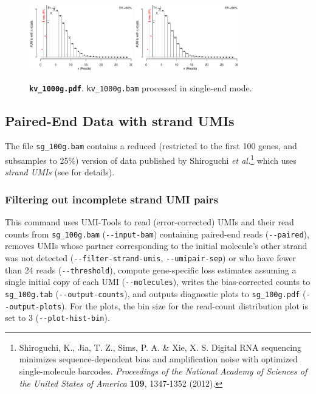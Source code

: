 \documentclass{scrartcl}
\makeatletter
\let\subsection@phlo\subsection
\renewcommand\subsection{\needspace{5\baselineskip}\subsection@phlo}
\newcommand{\shellscript}[1]{\bgroup\topsep=0pt\partopsep=0pt\shaded%
	\endshaded\egroup}
\newcommand{\ddarg}[1]{\texttt{-{}-#1}}
\DeclareRobustCommand*{\nameref}[1]{%
      \textit{\my@nameref{#1}}%
    }%
\makeatother
\begin{document}
\begin{figure}[H]
{\centering
\includegraphics[width=0.4\textwidth,page=1]{../examples/kv_1000g.pdf}\hfill
\includegraphics[width=0.4\textwidth,page=2]{../examples/kv_1000g.pdf}
\\}
\caption*{\textbf{\texttt{kv\_1000g.pdf}}. \texttt{kv\_1000g.bam} processed in single-end mode.}
\end{figure}

\subsection{Paired-End Data with strand UMIs}

The file \texttt{sg\_100g.bam} contains a reduced (restricted to the first 100 genes, and subsamples to 25\%) version of data published by Shiroguchi \textit{et al.}\footnote{Shiroguchi, K., Jia, T. Z., Sims, P. A. \& Xie, X. S. Digital RNA sequencing minimizes sequence-dependent bias and amplification noise with optimized single-molecule barcodes. \textit{Proceedings of the National Academy of Sciences of the United States of America} \textbf{109}, 1347-1352 (2012).} which uses \emph{strand UMIs} (see \nameref{strand-umis} for details).

\subsubsection*{Filtering out incomplete strand UMI pairs}

\shellscript{../examples/sg_100g.cmd}

\begin{sloppypar}
This command uses UMI-Tools to read (error-corrected) UMIs and their read counts from \texttt{sg\_100g.bam} (\ddarg{input-bam}) containing paired-end reads (\ddarg{paired}), removes UMIs whose partner corresponding to the initial molecule's other strand was not detected (\ddarg{filter-strand-umis}, \ddarg{umipair-sep}) or who have fewer than 24 reads (\ddarg{threshold}), compute gene-specific loss estimates assuming a single initial copy of each UMI (\ddarg{molecules}), writes the bias-corrected counts to \texttt{sg\_100g.tab} (\ddarg{output-counts}), and outputs diagnostic plots to \texttt{sg\_100g.pdf} (\ddarg{output-plots}). For the plots, the bin size for the read-count distribution plot is set to 3 (\ddarg{plot-hist-bin}).
\end{sloppypar}
\end{document}
